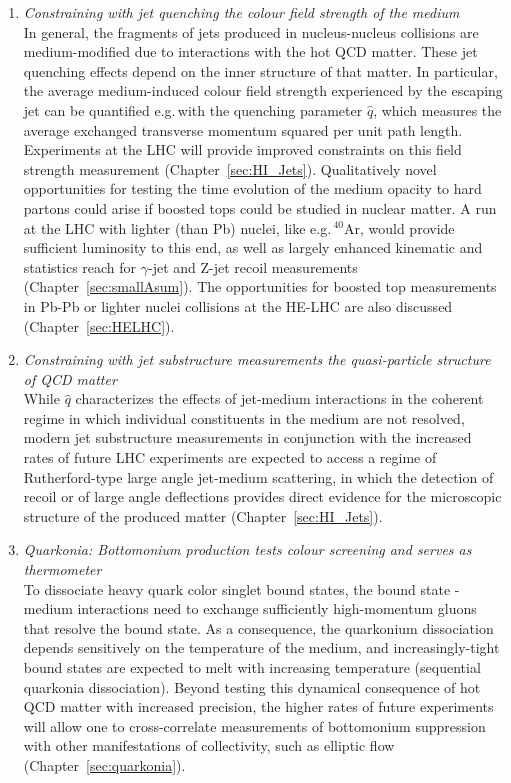 \documentclass[../report.tex]{subfiles}
\begin{document}
\begin{enumerate}
\item {\it Constraining with jet quenching the colour field strength of the medium}\\ In general, the fragments of jets produced in nucleus-nucleus collisions are medium-modified due to  interactions with the hot QCD matter. These jet quenching effects depend on the inner structure of that matter. In particular, the average medium-induced colour field strength experienced by the escaping jet can be quantified e.g.\,with the quenching parameter $\hat q$, which measures the average exchanged transverse momentum squared per unit path length. Experiments at the LHC will provide improved constraints on this field strength measurement (Chapter~\ref{sec:HI_Jets}).  Qualitatively novel opportunities for testing the time evolution of the medium opacity to hard partons could arise if boosted tops could be studied in nuclear matter. A run at the LHC with lighter (than Pb) nuclei, like e.g.\,$^{40}$Ar, would provide sufficient luminosity to this end, as well as largely enhanced kinematic and statistics reach for $\gamma$-jet and Z-jet recoil measurements (Chapter~\ref{sec:smallAsum}). The opportunities for boosted top measurements in Pb-Pb or lighter nuclei collisions at the HE-LHC are also discussed (Chapter~\ref{sec:HELHC}).
\item {\it Constraining with jet substructure measurements the quasi-particle structure of QCD matter}\\ While $\hat q$  characterizes the effects of jet-medium interactions in the coherent regime in which individual constituents in the medium are not resolved, modern jet substructure measurements in conjunction with the increased rates of future LHC experiments are expected to access a regime of Rutherford-type large angle jet-medium scattering, in which the detection of recoil or of large angle deflections provides direct evidence for the microscopic structure of the produced matter (Chapter~\ref{sec:HI_Jets}).  
\item {\it Quarkonia: Bottomonium production tests colour screening and serves as thermometer}\\To dissociate heavy quark color singlet bound states, the bound state - medium interactions need to exchange sufficiently high-momentum gluons that resolve the bound state. As a consequence, the quarkonium dissociation depends sensitively on the temperature of the medium, and 
increasingly-tight bound states are expected to melt with increasing temperature (sequential quarkonia dissociation). Beyond testing this dynamical consequence of hot QCD matter with increased precision, the higher rates of future experiments will allow one to cross-correlate measurements of bottomonium suppression with other manifestations of collectivity, such as elliptic flow (Chapter~\ref{sec:quarkonia}).

\end{enumerate}
\end{document}
